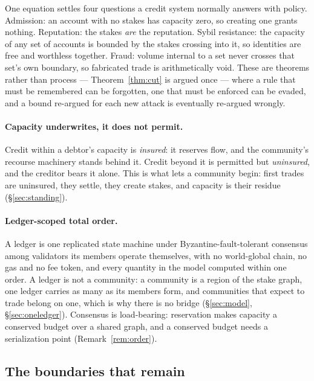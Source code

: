 One equation settles four questions a credit system normally answers with policy.
Admission: an account with no stakes has capacity zero, so creating one grants nothing.
Reputation: the stakes \emph{are} the reputation. Sybil resistance: the capacity of any set
of accounts is bounded by the stakes crossing into it, so identities are free and worthless
together. Fraud: volume internal to a set never crosses that set's own boundary, so
fabricated trade is arithmetically void. These are theorems rather than process ---
Theorem~\ref{thm:cut} is argued once --- where a rule that must be remembered can be
forgotten, one that must be enforced can be evaded, and a bound re-argued for each new
attack is eventually re-argued wrongly.

\paragraph{Capacity underwrites, it does not permit.} Credit within a debtor's capacity is
\emph{insured}: it reserves flow, and the community's recourse machinery stands behind it.
Credit beyond it is permitted but \emph{uninsured}, and the creditor bears it alone. This
is what lets a community begin: first trades are uninsured, they settle, they create
stakes, and capacity is their residue (\S\ref{sec:standing}).

\paragraph{Ledger-scoped total order.} A ledger is one replicated state machine under
Byzantine-fault-tolerant consensus among validators its members operate themselves, with
no world-global chain, no gas and no fee token, and every quantity in the model computed
within one order. A ledger is not a community: a community is a region of the stake
graph, one ledger carries as many as its members form, and communities that expect to
trade belong on one, which is why there is no bridge (\S\ref{sec:model},
\S\ref{sec:oneledger}). Consensus is load-bearing: reservation makes capacity a conserved
budget over a shared graph, and a conserved budget needs a serialization point
(Remark~\ref{rem:order}).

\subsection{The boundaries that remain}

